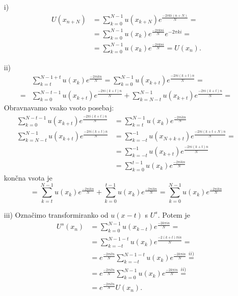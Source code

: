 \documentclass[mat2, tisk]{fmfdelo}
\begin{document}
\begin{dokaz}
  \hfill
\begin{enumerate}
  \item[i)]
  \begin{align*}
    U(x_{n+N}) &= \sum_{k=0}^{N-1} u(x_{k+N}) e^{\frac{-2\pi k i(n+N)}{N}} = \\
    &= \sum_{k=0}^{N-1} u(x_k) e^{\frac{-2\pi k n i}{N}} e^{-2\pi k i} = \\
    &= \sum_{k=0}^{N-1} u(x_k) e^{\frac{-2\pi k n i}{N}} = U(x_n).
  \end{align*}
\newpage
  \item[ii)]
  \begin{align*}
    &\sum_{k=t}^{N-1 + t} u(x_k) e^{\frac{-2\pi i k n}{N}} = \sum_{k=0}^{N-1} u(x_{k+t}) e^{\frac{-2\pi i (k+t) n}{N}} = \\
    =&\sum_{k=0}^{N-t-1} u(x_{k+t}) e^{\frac{-2\pi i (k+t) n}{N}} + 
    \sum_{k=N-t}^{N-1} u(x_{k+t}) e^{\frac{-2\pi i (k+t) n}{N}} = 
  \end{align*}
Obravnavamo vsako vsoto posebaj: 
\begin{align*}
\sum_{k=0}^{N-t-1} u(x_{k+t}) e^{\frac{-2\pi i (k+t) n}{N}} &= 
\sum_{k=t}^{N-1} u(x_{k}) e^{\frac{-2\pi i k n}{N}}\\[5mm]
  \sum_{k=N-t}^{N-1} u(x_{k+t}) e^{\frac{-2\pi i (k+t) n}{N}} &= 
  \sum_{k=-t}^{-1} u(x_{N+k+t}) e^{\frac{-2\pi i (k+t+N) n}{N}} = \\
  &= \sum_{k=-t}^{-1} u(x_{k+t}) e^{\frac{-2\pi i (k+t) n}{N}} \\
  &= \sum_{k=0}^{t-1} u(x_{k}) e^{\frac{-2\pi i k n}{N}}
\end{align*}
končna vsota je 
$$
= \sum_{k=t}^{N-1} u(x_{k}) e^{\frac{-2\pi i k n}{N}} + \sum_{k=0}^{t-1} u(x_{k}) e^{\frac{-2\pi i k n}{N}} = 
\sum_{k=0}^{N-1} u(x_{k}) e^{\frac{-2\pi i k n}{N}}
$$

\item[iii)] 
Označimo transformiranko od $u(x-t)$ s $U^s$. Potem je 
  \begin{align*}
    U^s(x_{n}) &= \sum_{k=0}^{N-1} u(x_{k-t}) e^{\frac{-2k \pi i n}{N}} = \\
    &= \sum_{k=-t}^{N-1-t} u(x_{k}) e^{\frac{-2(k+t) \pi i n}{N}} = \\
    &= e^{\frac{-2\pi i t n}{N}} \sum_{k=-t}^{N-1-t} u(x_{k}) e^{\frac{-2k \pi i n}{N}} \stackrel{ii)}{=} \\
    &=e^{\frac{-2\pi i t n}{N}} \sum_{k=0}^{N-1} u(x_{k}) e^{\frac{-2k \pi i n}{N}} \stackrel{ii)}{=} \\
    &= e^{\frac{-2\pi i t n}{N}} U(x_n).
  \end{align*}


\end{enumerate}
\end{dokaz}
\end{document}
